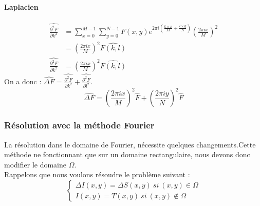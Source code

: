 \paragraph{Laplacien}
\begin{equation}
\begin{aligned}
\widehat{\frac{\partial^2 F}{\partial k ^2}} & = \sum_{x = 0}^{M-1} \sum_{y = 0}^{N-1} F(x,y) e^{2\pi i\left(\frac{k\times x}{M}+\frac{l\times y}{N}\right)}\left(\frac{2\pi i x}{M}\right)^2\\
& = \left(\frac{2\pi i x}{M}\right)^2 \widehat{F(k,l)}\\
\widehat{\frac{\partial^2 F}{\partial k^2}} &= \left(\frac{2\pi i x}{M}\right)^2\widehat{F(k,l)}
\end{aligned}
\end{equation}
On a donc : 
$\widehat{\Delta F} = \widehat{\frac{\partial^2 F}{\partial k^2}}+ \widehat{\frac{\partial^2 F}{\partial l^2}}$.
\begin{equation}
\widehat{\Delta F} = \left(\frac{2\pi i x}{M}\right)^2 \widehat{F}+\left(\frac{2\pi i y}{N}\right)^2 \widehat{F}
\end{equation}

\subsubsection{Résolution avec la méthode Fourier}
La résolution dans le domaine de Fourier, nécessite quelques changements.Cette méthode ne fonctionnant que sur un domaine rectangulaire, nous devons donc modifier le domaine $\Omega$.\\
Rappelons que nous voulons résoudre le problème suivant :
\begin{equation}
\left\{
\begin{aligned}
\Delta I(x,y) = \Delta S(x,y) \ si \ (x,y) \in \Omega\\
I(x,y) = T(x,y) \ si \ (x,y) \notin \Omega
\end{aligned}
\right.
\end{equation}

